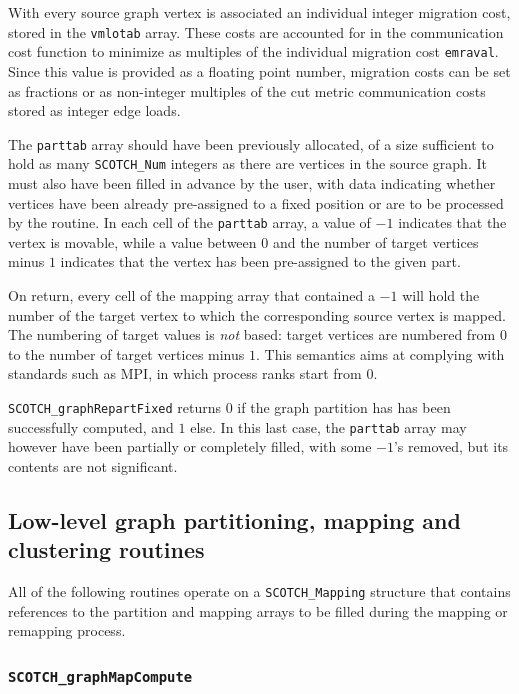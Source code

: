 \begin{itemize}
With every source graph vertex is associated an individual integer
migration cost, stored in the {\tt vmlotab} array. These costs are
accounted for in the communication cost function to minimize as
multiples of the individual migration cost {\tt emraval}. Since this
value is provided as a floating point number, migration costs can be
set as fractions or as non-integer multiples of the cut metric
communication costs stored as integer edge loads.

The {\tt parttab} array should have been previously allocated, of a
size sufficient to hold as many {\tt SCOTCH\_\lbt Num} integers as
there are vertices in the source graph. It must also have been filled
in advance by the user, with data indicating whether vertices have
been already pre-assigned to a fixed position or are to be processed
by the routine. In each cell of the {\tt parttab} array, a value of
$-1$ indicates that the vertex is movable, while a value between $0$
and the number of target vertices minus $1$ indicates that the vertex
has been pre-assigned to the given part.

On return, every cell of the mapping array that contained a $-1$ will
hold the number of the target vertex to which the corresponding source
vertex is mapped. The numbering of target values is {\em not\/}
based: target vertices are numbered from $0$ to the number of target
vertices minus $1$. This semantics aims at complying with standards
such as MPI, in which process ranks start from $0$.

\progret

{\tt SCOTCH\_graphRepartFixed} returns $0$ if the graph partition has
has been successfully computed, and $1$ else. In this last case, the
{\tt parttab} array may however have been partially or completely
filled, with some $-1$'s removed, but its contents are not
significant.
\end{itemize}

\subsection{Low-level graph partitioning, mapping and clustering routines}
\label{sec-lib-func-part-map-low}

All of the following routines operate on a {\tt SCOTCH\_\lbt Mapping}
structure that contains references to the partition and mapping arrays
to be filled during the mapping or remapping process.

\subsubsection{{\tt SCOTCH\_graphMapCompute}}

